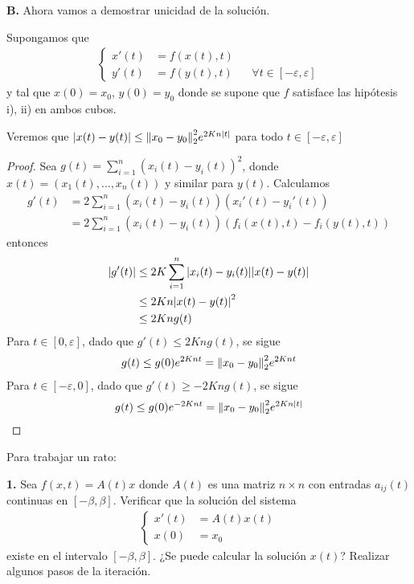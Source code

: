 \documentclass{article}
\begin{document}
\textbf{B.}
Ahora vamos a demostrar unicidad de la solución.

Supongamos que
\begin{align}
    \left\{\begin{aligned}
    x'(t) &= f(x(t), t) \\
    y'(t) &= f(y(t), t) &&\forall t \in [- \varepsilon, \varepsilon]
    \end{aligned}\right.
\end{align}
y tal que $x(0) = x_0$, $y(0) = y_0$ donde se supone que $f$ satisface las hipótesis i), ii) en ambos cubos.

Veremos que $\abs{x(t) - y(t)} \leq \norm{x_0 - y_0}_2^2 e^{2 K n \abs{t}}$ para todo $t \in [- \varepsilon, \varepsilon]$
\begin{proof}
Sea $g(t) = \sum_{i = 1}^n (x_i(t) - y_i(t))^2$, donde $x(t) = (x_1(t), \dots, x_n(t))$ y similar para $y(t)$.
Calculamos
\begin{align}
    g'(t)
    &=
    2 \sum_{i = 1}^n (x_i(t) - y_i(t)) (x_i'(t) - y_i'(t))
    \\
    &=
    2 \sum_{i = 1}^n (x_i(t) - y_i(t)) (f_i(x(t), t) - f_i(y(t), t))
\end{align}
entonces
\begin{align}
    \abs{g'(t)}
    &\leq
    2 K \sum_{i = 1}^n \abs{x_i(t) - y_i(t)} \abs{x(t) - y(t)}
    \\
    &\leq
    2 K n \abs{x(t) - y(t)}^2
    \\
    &\leq
    2 K n g(t)
\end{align}
Para $t \in  [0, \varepsilon]$, dado que $g'(t) \leq 2 K n g(t)$, se sigue
\begin{align}
    g(t)
    \leq
    g(0) e^{2 K n t}
    =
    \norm{x_0 - y_0}_2^2 e^{2 K n t}
\end{align}
Para $t \in [- \varepsilon, 0]$, dado que $g'(t) \geq - 2 K n g(t)$, se sigue
\begin{align}
    g(t)
    \leq
    g(0) e^{- 2 K n t}
    =
    \norm{x_0 - y_0}_2^2 e^{2 K n \abs{t}}
\end{align}
\end{proof}

\newpage
Para trabajar un rato:

\textbf{1.}
Sea $f(x, t) = A(t) x$ donde $A(t)$ es una matriz $n \times n$ con entradas $a_{i j}(t)$ continuas en $[- \beta, \beta]$.
Verificar que la solución del sistema
\begin{align}
    \left\{\begin{aligned}
    x'(t)   &= A(t) x(t)  \\
    x(0)    &= x_0
    \end{aligned}\right.
\end{align}
existe en el intervalo $[- \beta, \beta]$.
¿Se puede calcular la solución $x(t)$?
Realizar algunos pasos de la iteración.
\end{document}
